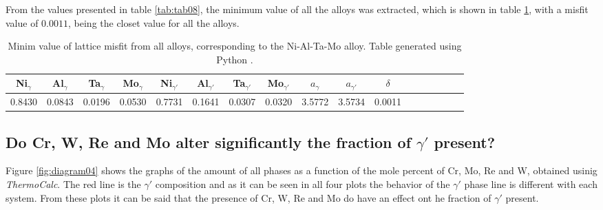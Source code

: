 From the values presented in table \ref{tab:tab08}, the minimum value of all the alloys was extracted, which is shown in table \ref{tab:tab09}, with a misfit value of $0.0011$, being the closet value for all the alloys.

\begin{table}[h]
  \begin{tabular}{rrrrrrrrrrrrrrrrr}
    \multicolumn{1}{c}{Ni$_\gamma$} & \multicolumn{1}{c}{Al$_\gamma$} & \multicolumn{1}{c}{Ta$_\gamma$} & \multicolumn{1}{c}{Mo$_\gamma$} & \multicolumn{1}{c}{Ni$_{\gamma'}$} & \multicolumn{1}{c}{Al$_{\gamma'}$} & \multicolumn{1}{c}{Ta$_{\gamma'}$} & \multicolumn{1}{c}{Mo$_{\gamma'}$} & \multicolumn{1}{c}{$a_\gamma$} & \multicolumn{1}{c}{$a_{\gamma'}$} & \multicolumn{1}{c}{$\delta$} \\ \hline \hline
    0.8430 & 0.0843 & 0.0196 & 0.0530 & 0.7731 & 0.1641 & 0.0307 & 0.0320 & 3.5772 & 3.5734 & 0.0011
  \end{tabular}
  \caption{Minim value of lattice misfit from all alloys, corresponding to the Ni-Al-Ta-Mo alloy. Table generated using Python \citep{mygit}.}
  \label{tab:tab09}
\end{table}

\newpage
\subsection{Do Cr, W, Re and Mo alter significantly the fraction of $\gamma'$ present?}

Figure \ref{fig:diagram04} shows the graphs of the amount of all phases as a function of the mole percent of Cr, Mo, Re and W, obtained usinig \textit{ThermoCalc}. The red line is the $\gamma'$ composition and as it can be seen in all four plots the behavior of the $\gamma'$ phase line is different with each system. From these plots it can be said that the presence of Cr, W, Re and Mo do have an effect ont he fraction of $\gamma'$ present.



